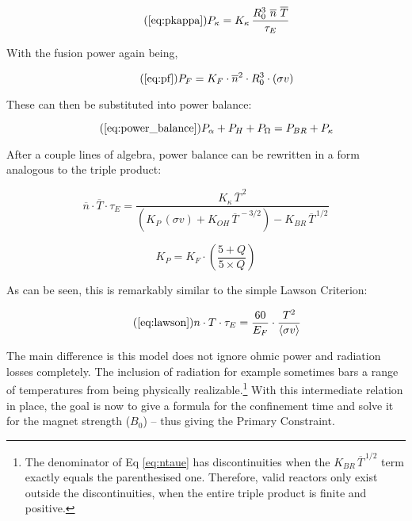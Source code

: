 \begin{equation}
	\tag{\ref{eq:pkappa}}
	P_\kappa = K_\kappa \, \frac{ R_0 ^ 3 \ \overline{n}  \ \overline{T}  }{\tau_E} 
\end{equation}

With the fusion power again being,

\begin{equation}
	\tag{\ref{eq:pf}}
	P_F = K_F \cdot \overline{n}^2 \cdot R_0^3  \cdot (\sigma v)
\end{equation}

These can then be substituted into power balance:

\begin{equation}
	\tag{\ref{eq:power_balance}}
	P_\alpha + P_H + P_\Omega = P_{BR} + P_\kappa
\end{equation}

After a couple lines of algebra, power balance can be rewritten in a form analogous to the triple product:

\begin{equation}
	\label{eq:ntaue}
	 \overline{n}  \cdot \overline{T} \cdot \tau_E = \frac{ K_\kappa \, \overline{T}^{\,2} }{ \left( K_P \, (\sigma v) +  K_{OH} \, \overline{T}^{  \,-3/2 } \right) - K_{BR} \, \overline{T}^{  \,1/2 } }
\end{equation}

\begin{equation}
	K_P = K_F \cdot \left( \frac{5 + Q}{5 \times Q} \right)
\end{equation}

As can be seen, this is remarkably similar to the simple Lawson Criterion:

\begin{equation}
	\tag{\ref{eq:lawson}}
	n \cdot T \cdot \tau_E = \frac{ 60 }{ E_F } \cdot \frac{ T ^ 2 }{ \langle \sigma v \rangle }
\end{equation} 

The main difference is this model does not ignore ohmic power and radiation losses completely. The inclusion of radiation for example sometimes bars a range of temperatures from being physically realizable.\footnote{ The denominator of Eq \ref{eq:ntaue} has discontinuities when the $K_{BR} \, \overline{T}^{  \,1/2 }$ term exactly equals the parenthesised one. Therefore, valid reactors only exist outside the discontinuities, when the entire triple product is finite and positive. } With this intermediate relation in place, the goal is now to give a formula for the confinement time and solve it for the magnet strength ($B_0$) -- thus giving the Primary Constraint.

